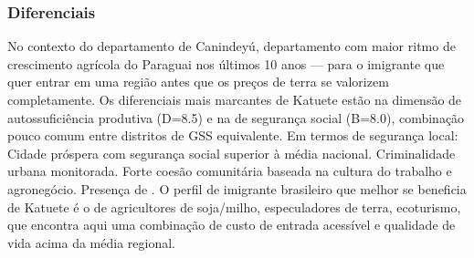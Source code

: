\subsubsection*{Diferenciais}\label{dif-katuete-1408}
No contexto do departamento de Canindeyú, departamento com maior ritmo de crescimento agrícola do Paraguai nos últimos 10 anos — para o imigrante que quer entrar em uma região antes que os preços de terra se valorizem completamente. Os diferenciais mais marcantes de Katuete estão na dimensão de autossuficiência produtiva (D=8.5) e na de segurança social (B=8.0), combinação pouco comum entre distritos de GSS equivalente. Em termos de segurança local: Cidade próspera com segurança social superior à média nacional. Criminalidade urbana monitorada. Forte coesão comunitária baseada na cultura do trabalho e agronegócio. Presença de . O perfil de imigrante brasileiro que melhor se beneficia de Katuete é o de agricultores de soja/milho, especuladores de terra, ecoturismo, que encontra aqui uma combinação de custo de entrada acessível e qualidade de vida acima da média regional.
